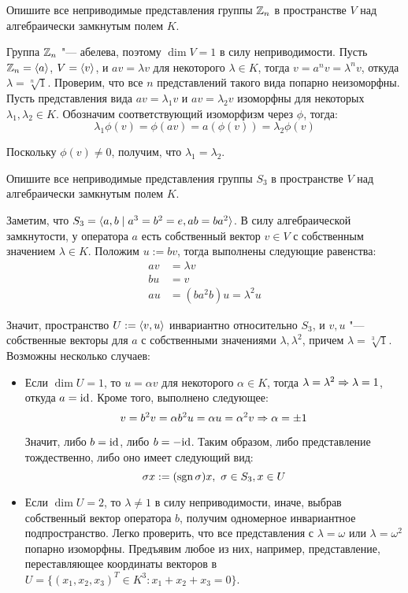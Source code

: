 \begin{problem}
	Опишите все неприводимые представления группы $\mathbb{Z}_n$ в пространстве $V$ над алгебраически замкнутым полем $K$.
\end{problem}

\begin{solution}
	 Группа $\mathbb{Z}_n$ "--- абелева, поэтому $\dim{V} = 1$ в силу неприводимости. Пусть $\mathbb{Z}_n = \langle a\rangle$, $V = \langle v \rangle$, и $av = \lambda v$ для некоторого $\lambda \in K$, тогда $v = a^nv = \lambda^n v$, откуда $\lambda = \sqrt[n]{1}$. Проверим, что все $n$ представлений такого вида попарно неизоморфны. Пусть представления вида $av = \lambda_1 v$ и $av = \lambda_2 v$ изоморфны для некоторых $\lambda_1, \lambda_2 \in K$. Обозначим соответствующий изоморфизм через $\phi$, тогда:
	\[\lambda_1\phi(v) = \phi(av) = a(\phi(v)) = \lambda_2\phi(v)\]
	
	Поскольку $\phi(v) \ne 0$, получим, что $\lambda_1 = \lambda_2$.
\end{solution}

\begin{problem}
	Опишите все неприводимые представления группы $S_3$ в пространстве $V$ над алгебраически замкнутым полем $K$.
\end{problem}

\begin{solution}
	Заметим, что $S_3 = \langle a, b \mid a^3 = b^2 = e, ab = ba^2\rangle$. В силу алгебраической замкнутости, у оператора $a$ есть собственный вектор $v \in V$ с собственным значением $\lambda \in K$. Положим $u := bv$, тогда выполнены следующие равенства:
	\begin{align*}
		av &= \lambda v
		\\
		bu &= v
		\\
		au &= (ba^2b)u = \lambda^2u
	\end{align*}
	
	 Значит, пространство $U := \langle v, u\rangle$ инвариантно относительно $S_3$, и $v, u$ "--- собственные векторы для $a$ с собственными значениями $\lambda, \lambda^2$, причем $\lambda = \sqrt[3]{1}$. Возможны несколько случаев:
	 \begin{itemize}
	 	\item Если $\dim{U} = 1$, то $u = \alpha v$ для некоторого $\alpha \in K$, тогда $\lambda = \lambda^2 \Rightarrow \lambda = 1$, откуда $a = \mathrm{id}$. Кроме того, выполнено следующее:
	 	\[v = b^2v = \alpha b^2u = \alpha u = \alpha^2 v \Rightarrow \alpha = \pm1\]
	 	
	 	Значит, либо $b = \mathrm{id}$, либо $b = -\mathrm{id}$. Таким образом, либо представление тождественно, либо оно имеет следующий вид:
	 	\[\sigma x := (\operatorname{sgn}\sigma)x,~\sigma \in S_3, x \in U\]
	 	
	 	\item Если $\dim{U} = 2$, то $\lambda \ne 1$ в силу неприводимости, иначе, выбрав собственный вектор оператора $b$, получим одномерное инвариантное подпространство. Легко проверить, что все представления с $\lambda = \omega$ или $\lambda = \omega^2$ попарно изоморфны. Предъявим любое из них, например, представление, переставляющее координаты векторов в $U = \{(x_1, x_2, x_3)^T \in K^3: x_1 + x_2 + x_3 = 0\}$.
	 \end{itemize}
\end{solution}


